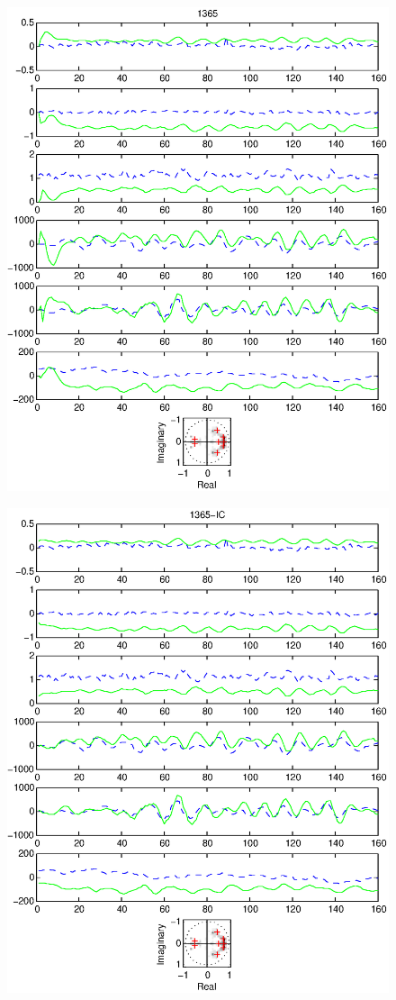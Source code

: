 \documentclass{article}
\begin{document}
\begin{figure}[htb!]
\centering
\includegraphics{1365.eps}
\end{figure}\clearpage
\begin{figure}[htb!]
\centering
\includegraphics{1365_ic.eps}
\end{figure}\clearpage
\end{document}
